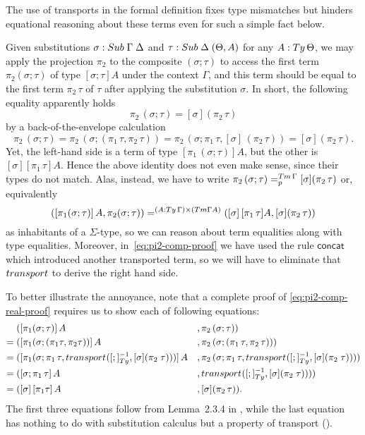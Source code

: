 \documentclass[a4paper,UKenglish,numberwithinsect,cleveref,thm-restate]{lipics-v2021}
\begin{document}
The use of transports in the formal definition fixes type mismatches but hinders equational reasoning about these terms even for such a simple fact below.
\begin{example}\label{ex:pi2-comp}
  Given substitutions $\sigma : \Sub\;\Gamma\; \Delta$ and $\tau : \Sub\;\Delta\;(\Theta, A)$ for any $A : \Ty\,\Theta$, we may apply the projection $\pi_2$ to the composite $(\sigma; \tau)$ to access the first term $\pi_2(\sigma; \tau)$ of type $[\sigma;\tau] A$ under the context $\Gamma$, and this term should be equal to the first term $\pi_2\,\tau$ of $\tau$ after applying the substitution $\sigma$. 
  In short, the following equality apparently holds
  \[
    \pi_2\,(\sigma ; \tau) = [\sigma] (\pi_2\,\tau)
  \]
  by a back-of-the-envelope calculation
  \begin{equation} \label{eq:pi2-comp-proof}
    \pi_2\,(\sigma ; \tau) 
    = \pi_2\,(\sigma; (\pi_1\,\tau, \pi_2\,\tau))
    = \pi_2\,(\sigma;\pi_1\,\tau, [\sigma]\,(\pi_2\,\tau))
    = [\sigma] (\pi_2\,\tau).
  \end{equation}
  Yet, the left-hand side is a term of type $[\pi_1\,(\sigma;\tau)] A$, but the other is $[\sigma] [\pi_1\,\tau] A$.
  Hence the above identity does not even make sense, since their types do not match.
  Alas, instead, we have to write $\pi_2\,(\sigma ; \tau) =^{\Tm\,\Gamma}_{p} [\sigma] (\pi_2\,\tau)$ or, equivalently
  \begin{equation}\label{eq:pi2-comp-real-proof}
    ([\pi_1(\sigma; \tau)]\,A, \pi_2(\sigma; \tau)) =^{(A : \Ty\,\Gamma) \times (\Tm \Gamma A)} ([\sigma]\,[\pi_1\,\tau]A, [\sigma] (\pi_2\,\tau))
  \end{equation}
  as inhabitants of a $\Sigma$-type, so we can reason about term equalities along with type equalities.
  Moreover, in~\eqref{eq:pi2-comp-proof} we have used the rule $\mathsf{concat}$ which introduced another transported term, so we will have to eliminate that $\transp$ to derive the right hand side.

  To better illustrate the annoyance, note that a complete proof of \eqref{eq:pi2-comp-real-proof} requires us to show each of following equations:
  \begin{alignat*}{3}
         & ([\pi_1(\sigma; \tau)]\,A                    &&, \pi_2\,(\sigma ; \tau)) \\
    = {} & ([\pi_1(\sigma; (\pi_1\tau , \pi_2\tau))]\,A &&, \pi_2\,(\sigma; (\pi_1\,\tau, \pi_2\,\tau))) \\
    = {} & ([\pi_1(\sigma;\pi_1\,\tau, \transfib{}{[;]_{\Ty}^{-1}}{\color{black}[ \sigma ] (\pi_2\;\tau)})]\,A &&, \pi_2\,(\sigma;\pi_1\,\tau, \transfib{}{[;]_{\Ty}^{-1}}{\color{black}[ \sigma ] (\pi_2\;\tau)})) \\
    = {} & ([\sigma;\pi_1\,\tau]\,A &&, \transfib{}{[;]_{\Ty}^{-1}}{\color{black}[ \sigma ] (\pi_2\;\tau)})) \nonumber \\
    = {} & (\sub{\sigma}{\sub{\pi_1\tau}{A}} &&, [\sigma] (\pi_2\,\tau)). \nonumber
  \end{alignat*}
  The first three equations follow from Lemma~2.3.4 in \cite{UFP2013}, while the last equation has nothing to do with substitution calculus but a property of transport (\cite[Lemma~2.3.2]{UFP2013}).
\end{example}
\end{document}
